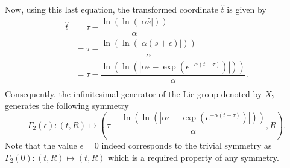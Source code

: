 Now, using this last equation, the transformed coordinate $\hat{t}$ is given by
\begin{align*}
  \hat{t}&=\tau-\dfrac{\ln\left(\ln\left(|\alpha \hat{s}|\right)\right)}{\alpha}\\
         &=\tau-\dfrac{\ln\left(\ln\left(\left|\alpha (s+\epsilon)\right|\right)\right)}{\alpha}\\
         &=\tau-\dfrac{\ln\left(\ln\left(\left|\alpha\epsilon-\exp\left(e^{-\alpha (t-\tau)}\right)\right|\right)\right)}{\alpha}.\\  
\end{align*}
Consequently, the infinitesimal generator of the Lie group denoted by $X_2$ generates the following symmetry
$$\Gamma_2(\epsilon):(t,R)\mapsto\left(\tau-\dfrac{\ln\left(\ln\left(\left|\alpha\epsilon-\exp\left(e^{-\alpha (t-\tau)}\right)\right|\right)\right)}{\alpha},R\right).$$
Note that the value $\epsilon=0$ indeed corresponds to the trivial symmetry as $\Gamma_2(0):(t,R)\mapsto(t,R)$ which is a required property of any symmetry.